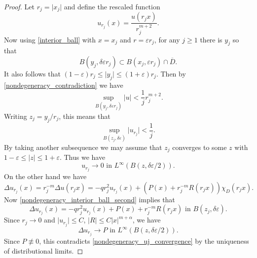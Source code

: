 \documentclass[10pt,a4paper]{amsart}
\newcommand{\abs}[1]{\lvert #1 \rvert}          %
\newcommand{\eps}{\varepsilon}
\newcommand{\ol}[1]{\overline{#1}}
\begin{document}
\begin{proof}
Let $r_j = \abs{x_j}$ and define the rescaled function 
\[
u_{r_j}(x) = \frac{u(r_j x)}{r_j^{m+2}}.
\]
Now using \eqref{interior_ball} with $x=x_j$ and $r = \eps r_j$, for any $j \geq 1$ there is $y_j$ so that 
\begin{equation} \label{nondegeneracy_interior_ball_second}
B(y_j, \delta \eps r_j) \subset B(x_j, \eps r_j) \cap \ol{D}.
\end{equation}
It also follows that $(1-\eps) r_j \leq \abs{y_j} \leq (1+\eps) r_j$. Then by \eqref{nondegeneracy_contradiction} we have 
\[
\sup_{B(y_j, \delta \eps r_j)} \abs{u} < \frac{1}{j} r_j^{m+2}.
\]
Writing $z_j = y_j/r_j$, this means that 
\[
\sup_{B(z_j, \delta \eps)} \abs{u_{r_j}} < \frac{1}{j}.
\]
By taking another subsequence we may assume that $z_j$ converges to some $z$ with $1-\eps \leq \abs{z} \leq 1+\eps$. Thus we have 
\begin{equation} \label{nondegeneracy_uj_convergence}
u_{r_j} \to 0 \text{ in $L^{\infty}(B(z, \delta \eps/2))$}.
\end{equation}
On the other hand we have 
\[
\Delta u_{r_j}(x) = r_j^{-m} \Delta u(r_j x) = -q r_j^2 u_{r_j}(x) + (P(x) + r_j^{-m} R(r_j x)) \chi_D(r_j x).
\]
Now \eqref{nondegeneracy_interior_ball_second} implies that 
\[
\Delta u_{r_j}(x) = -q r_j^2 u_{r_j}(x) + P(x) + r_j^{-m} R(r_j x) \text{ in $B(z_j, \delta \eps)$}.
\]
Since $r_j \to 0$ and $\abs{u_{r_j}} \leq C$, $\abs{R} \leq C \abs{x}^{m+\alpha}$, we have 
\[
\Delta u_{r_j} \to P \text{ in $L^{\infty}(B(z, \delta \eps/2))$}.
\]
Since $P \not\equiv 0$, this contradicts \eqref{nondegeneracy_uj_convergence} by the uniqueness of distributional limits.
\end{proof}
\end{document}
